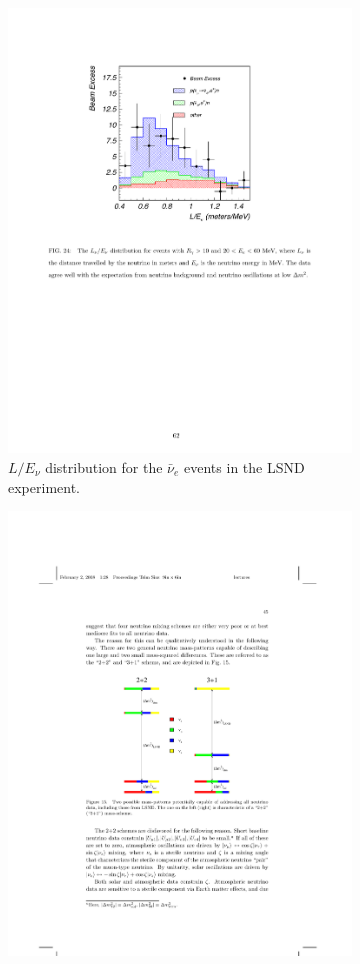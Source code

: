 \begin{figure}
  \begin{subfigure}{0.45\textwidth}
    \includegraphics[height=\linewidth]{figures/lsndresult.pdf}
    \caption{$L/E_{\nu}$ distribution for the $\bar{\nu}_{e}$ events in the LSND experiment.}\label{fig:resultlsnd}
  \end{subfigure}\hfill
  \begin{subfigure}{0.45\textwidth}
    \begin{center}
        \includegraphics[height=\linewidth]{figures/masslsnd.pdf}

\end{center}
\end{subfigure}
\end{figure}
